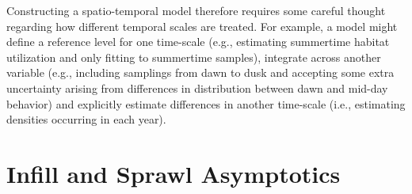 Constructing a spatio-temporal model therefore requires some careful thought regarding how different temporal scales are treated. For example, a model might define a reference level for one time-scale (e.g., estimating summertime habitat utilization and only fitting to summertime samples), integrate across another variable (e.g., including samplings from dawn to dusk and accepting some extra uncertainty arising from differences in distribution between dawn and mid-day behavior) and explicitly estimate differences in another time-scale (i.e., estimating densities occurring in each year).  

\section{Infill and Sprawl Asymptotics}

